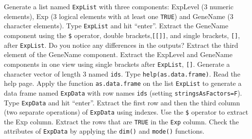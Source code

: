 \documentclass[12pt]{article}
\newcommand{\code}[1]{{\texttt{#1}}}
\begin{document}
Generate a list named \code{ExpList} with three components: ExpLevel (3 numeric elements), Exp (3 logical elements with at least one \code{TRUE}) and GeneName (3 character elements).  Type \code{ExpList} and hit ``enter''.  Extract the GeneName component using the \code{\$} operator, double brackets,\code{[[]]}, and single brackets, \code{[]}, after \code{ExpList}.  Do you notice any differences in the outputs?  Extract the third element of the GeneName component.  Extract the ExpLevel and GeneName components in one view using single brackets after \code{ExpList}, \code{[]}.  Generate a character vector of length 3 named \code{ids}.  Type \code{help(as.data.frame)}.  Read the help page.  Apply the function \code{as.data.frame} on the list \code{ExpList} to generate a data frame named \code{ExpData} with row names \code{ids} (setting \code{stringsAsFactors=F}).  Type \code{ExpData} and hit ``enter''. Extract the first row and then the third column (two separate operations) of \code{ExpData} using indexes.  Use the \code{\$} operator to extract the Exp column.  Extract the rows that are \code{TRUE} in the \code{Exp} column.  Check the attributes of \code{ExpData} by applying the \code{dim()} and \code{mode()} functions.
\end{document}
